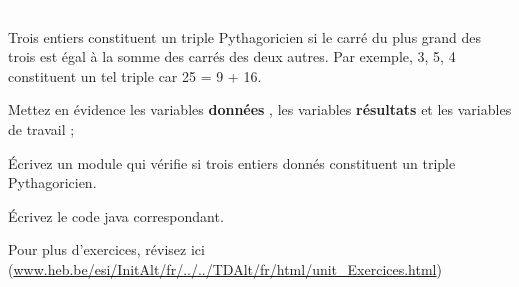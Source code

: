 \documentclass[11pt,a4paper]{article}
\begin{document}
					\textcolor{white}{.} \par
				
          Trois entiers constituent un triple Pythagoricien si le carr\'e du plus grand des trois est \'egal \`a la somme des carr\'es des deux autres. 
          Par exemple, 3, 5, 4 constituent un tel triple car 25 = 9 + 16.
        
            \par
        
          Mettez en \'evidence les variables \textbf{\guillemotleft  donn\'ees \guillemotright }, 
          les variables \textbf{\guillemotleft  r\'esultats \guillemotright } et les variables de travail ;
        
            \par
        
          \'Ecrivez un module qui v\'erifie si trois entiers donn\'es constituent un triple Pythagoricien.
        
            \par
        \'Ecrivez le code java correspondant.
            \par
        Pour plus d'exercices, 
        r\'evisez ici (\url{www.heb.be/esi/InitAlt/fr/../../TDAlt/fr/html/unit\_Exercices.html})
            \par
        
				
\end{document}
